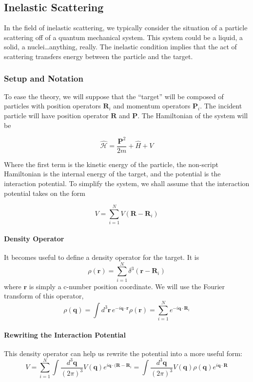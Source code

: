 \documentclass{article}
\begin{document}
			\subsection{Inelastic Scattering}
			In the field of inelastic scattering, we typically consider the situation of a particle scattering off of a quantum mechanical system. This system could be a liquid, a solid, a nuclei\ldots anything, really. The inelastic condition implies that the act of scattering transfers energy between the particle and the target. 
			
			\subsubsection{Setup and Notation} To ease the theory, we will suppose that the ``target'' will be composed of particles with position operators $\mathbf{R}_i$ and momentum operators $\mathbf{P}_i$. The incident particle will have position operator $\mathbf{R}$ and $\mathbf{P}$. The Hamiltonian of the system will be
			
			$$\hat{\mathscr{H}}=\frac{\mathbf{P}^2}{2m}+\hat{H}+V$$
			
			Where the first term is the kinetic energy of the particle, the non-script Hamiltonian is the internal energy of the target, and the potential is the interaction potential. To simplify the system, we shall assume that the interaction potential takes on the form
			
			
			$$V=\sum_{i=1}^N V(\mathbf{R}-\mathbf{R}_i)$$
			
			
			\paragraph{Density Operator} It becomes useful to define a density operator for the target. It is
			$$\rho(\mathbf{r})=\sum_{i=1}^N \delta^3(\mathbf{r}-\mathbf{R}_i)$$
			where $\mathbf{r}$ is simply a c-number position coordinate. We will use the Fourier transform of this operator,
			$$\rho(\mathbf{q})=\int d^3\mathbf{r}\,e^{-i\mathbf{q}\cdot\mathbf{r}}\rho(\mathbf{r})=\sum_{i=1}^Ne^{-i\mathbf{q}\cdot\mathbf{R}_i}$$
			\paragraph{Rewriting the Interaction Potential} This density operator can help us rewrite the potential into a more useful form:
			$$V=\sum_{i=1}^N \int\frac{d^3\mathbf{q}}{(2\pi)^3}V(\mathbf{q})e^{i\mathbf{q}\cdot(\mathbf{R}-\mathbf{R}_i}=\int\frac{d^3\mathbf{q}}{(2\pi)^3}V(\mathbf{q}) \rho(\mathbf{q})e^{i\mathbf{q}\cdot\mathbf{R}}$$
\end{document}
